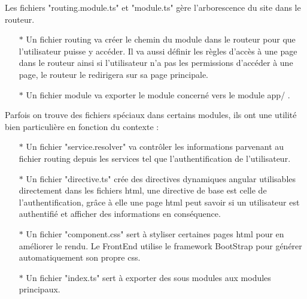 \documentclass{article}
\begin{document}
Les fichiers "routing.module.ts" et "module.ts" gère l'arborescence du site dans le routeur.
\begin{itemize}
	\item[$\ast$]Un fichier routing va créer le chemin du module dans le routeur pour que l'utilisateur puisse y accéder. Il va aussi définir les règles d'accès à une page dans le routeur ainsi si l'utilisateur n'a pas les permissions d'accéder à une page, le routeur le redirigera sur sa page principale.
	\item[$\ast$]Un fichier module va exporter le module concerné vers le module app/ .
\end{itemize}

Parfois on trouve des fichiers spéciaux dans certains modules, ils ont une utilité bien particulière en fonction du contexte :
\begin{itemize}
	\item[$\ast$]Un fichier "service.resolver" va contrôler les informations parvenant au fichier routing depuis les services tel que l'authentification de l'utilisateur.
	\item[$\ast$]Un fichier "directive.ts" crée des directives dynamiques angular utilisables directement dans les fichiers html, une directive de base est celle de l'authentification, grâce à elle une page html peut savoir si un utilisateur est authentifié et afficher des informations en conséquence.
	\item[$\ast$]Un fichier "component.css" sert à styliser certaines pages html pour en améliorer le rendu. Le FrontEnd utilise le framework BootStrap pour générer automatiquement son propre css.
	\item[$\ast$]Un fichier "index.ts" sert à exporter des sous modules aux modules principaux.
\end{itemize}
\end{document}
